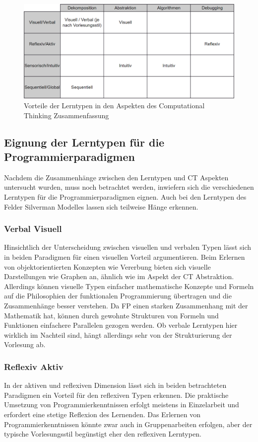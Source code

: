 \begin{figure}[H]
    \centering
    \includegraphics[width=1\linewidth]{Figures/Section_3/Styles_CT}
    \caption{Vorteile der Lerntypen in den Aspekten des Computational Thinking Zusammenfassung}
\end{figure}

\subsection{Eignung der Lerntypen für die Programmierparadigmen}
Nachdem die Zusammenhänge zwischen den Lerntypen und CT Aspekten untersucht wurden, muss noch betrachtet werden, inwiefern sich die verschiedenen Lerntypen für die Programmierparadigmen eignen.
Auch bei den Lerntypen des Felder Silverman Modelles lassen sich teilweise Hänge erkennen.

\subsubsection{Verbal Visuell}
Hinsichtlich der Unterscheidung zwischen visuellen und verbalen Typen lässt sich in beiden Paradigmen für einen visuellen Vorteil argumentieren. Beim Erlernen von objektorientierten Konzepten wie Vererbung bieten sich visuelle Darstellungen wie Graphen an, ähnlich wie im Aspekt der CT Abstraktion.
Allerdings können visuelle Typen einfacher mathematische Konzepte und Formeln auf die Philosophien der funktionalen Programmierung übertragen und die Zusammenhänge besser verstehen. Da FP einen starken Zusammenhang mit der Mathematik hat, können durch gewohnte Strukturen von Formeln und Funktionen einfachere Parallelen gezogen werden.
Ob verbale Lerntypen hier wirklich im Nachteil sind, hängt allerdings sehr von der Strukturierung der Vorlesung ab.

\subsubsection{Reflexiv Aktiv}
In der aktiven und reflexiven Dimension lässt sich in beiden betrachteten Paradigmen ein Vorteil für den reflexiven Typen erkennen. Die praktische Umsetzung von Programmierkenntnissen erfolgt meistens in Einzelarbeit und erfordert eine stetige Reflexion des Lernenden.
Das Erlernen von Programmierkenntnissen könnte zwar auch in Gruppenarbeiten erfolgen, aber der typische Vorlesungsstil begünstigt eher den reflexiven Lerntypen.

